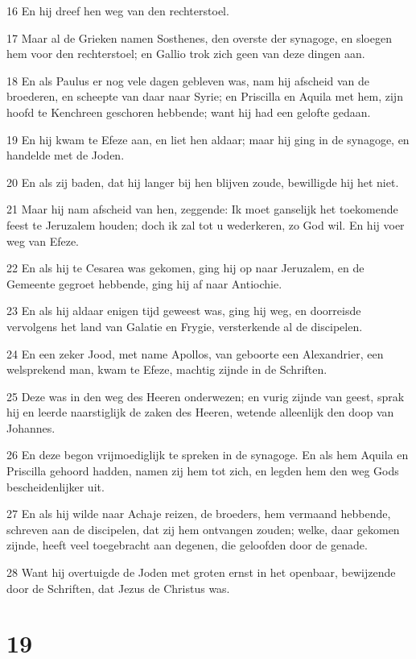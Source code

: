 \par 16 En hij dreef hen weg van den rechterstoel.
\par 17 Maar al de Grieken namen Sosthenes, den overste der synagoge, en sloegen hem voor den rechterstoel; en Gallio trok zich geen van deze dingen aan.
\par 18 En als Paulus er nog vele dagen gebleven was, nam hij afscheid van de broederen, en scheepte van daar naar Syrie; en Priscilla en Aquila met hem, zijn hoofd te Kenchreen geschoren hebbende; want hij had een gelofte gedaan.
\par 19 En hij kwam te Efeze aan, en liet hen aldaar; maar hij ging in de synagoge, en handelde met de Joden.
\par 20 En als zij baden, dat hij langer bij hen blijven zoude, bewilligde hij het niet.
\par 21 Maar hij nam afscheid van hen, zeggende: Ik moet ganselijk het toekomende feest te Jeruzalem houden; doch ik zal tot u wederkeren, zo God wil. En hij voer weg van Efeze.
\par 22 En als hij te Cesarea was gekomen, ging hij op naar Jeruzalem, en de Gemeente gegroet hebbende, ging hij af naar Antiochie.
\par 23 En als hij aldaar enigen tijd geweest was, ging hij weg, en doorreisde vervolgens het land van Galatie en Frygie, versterkende al de discipelen.
\par 24 En een zeker Jood, met name Apollos, van geboorte een Alexandrier, een welsprekend man, kwam te Efeze, machtig zijnde in de Schriften.
\par 25 Deze was in den weg des Heeren onderwezen; en vurig zijnde van geest, sprak hij en leerde naarstiglijk de zaken des Heeren, wetende alleenlijk den doop van Johannes.
\par 26 En deze begon vrijmoediglijk te spreken in de synagoge. En als hem Aquila en Priscilla gehoord hadden, namen zij hem tot zich, en legden hem den weg Gods bescheidenlijker uit.
\par 27 En als hij wilde naar Achaje reizen, de broeders, hem vermaand hebbende, schreven aan de discipelen, dat zij hem ontvangen zouden; welke, daar gekomen zijnde, heeft veel toegebracht aan degenen, die geloofden door de genade.
\par 28 Want hij overtuigde de Joden met groten ernst in het openbaar, bewijzende door de Schriften, dat Jezus de Christus was.

\chapter{19}

